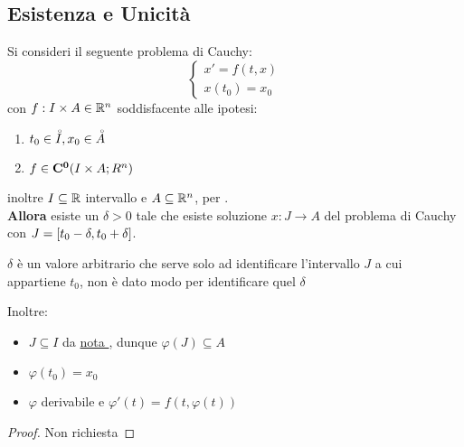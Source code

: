 \subsection{Esistenza e Unicità}
\begin{proposition}
	\label{teo:peano}
	Si consideri il seguente problema di Cauchy:
	\[\left\{\begin{matrix} x'=f(t,x)\\x(t_0)=x_0\end{matrix}\right.\]
	con $f:I\times A\in \mathbb{R}^n$ soddisfacente alle ipotesi:
	\begin{enumerate}
		\item $t_0\in \accentset{\circ}{I}, x_0\in \accentset{\circ}{A}$
		\item $f\in \mathbf{C^{0}}(I\times A;R^n)$
	\end{enumerate}
	inoltre $I\subseteq \mathbb{R}$ intervallo e $A\subseteq \mathbb{R}^n$, per .\\
	\textbf{Allora} esiste un $\delta>0$ tale che esiste soluzione $x: J\to A$ del problema di Cauchy con $J=\left[t_0-\delta,t_0+\delta\right]$.
	\begin{note}
		$\delta$ è un valore arbitrario che serve solo ad identificare l'intervallo $J$ a cui appartiene $t_0$, non è dato modo per identificare quel $\delta$
	\end{note}
	Inoltre:
	\begin{itemize}
		\item $J\subseteq I$ da \hyperlink{note:diff_eq_sol_definit_set}{nota }, dunque $\varphi(J)\subseteq A$
		\item $\varphi(t_0)=x_0$
		\item $\varphi$ derivabile e $\varphi'(t)=f(t,\varphi(t))$
	\end{itemize}
	\begin{proof}
		Non richiesta
	\end{proof}
\end{proposition}
